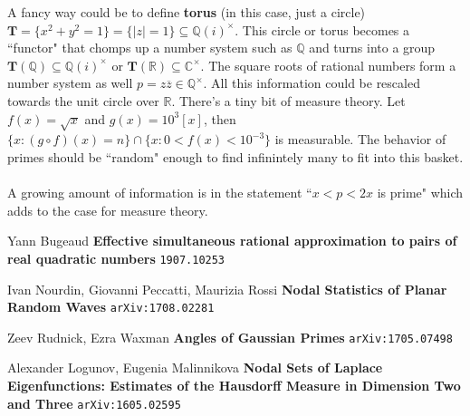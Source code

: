 \documentclass[12pt]{article}
\begin{document}
A fancy way could be to define \textbf{torus} (in this case, just a circle) $\mathbf{T} = \{ x^2 + y^2 = 1\} = \{ |z| = 1\} \subseteq \mathbb{Q}(i)^\times $.  This circle or torus becomes a ``functor" that chomps up a number system such as $\mathbb{Q}$ and turns into a group
$\mathbf{T}(\mathbb{Q}) \subseteq \mathbb{Q}(i)^\times $ or $\mathbf{T}(\mathbb{R}) \subseteq \mathbb{C}^\times$.  The square roots of rational numbers form a number system as well $p =  z \overline{z} \in \mathbb{Q}^\times$.  All this information could be rescaled towards the unit circle over $\mathbb{R}$.  There's a tiny bit of measure theory.  Let $f(x) = \sqrt{x}$ and $g(x) = 10^3[x]$, then $ \{ x : (g \circ f)(x) = n   \} \cap \{ x : 0 < f(x) < 10^{-3} \} $ is measurable.  The behavior of primes should be ``random" enough to find infinintely many to fit into this basket. \\ \\
A growing amount of information is in the statement ``$x < p < 2x $ is prime" which adds to the case for measure theory.
\vfill



\begin{thebibliography}{}

\item Yann Bugeaud {\textbf{Effective simultaneous rational approximation to pairs of real quadratic numbers}} \texttt{1907.10253}
\item Ivan Nourdin, Giovanni Peccatti, Maurizia Rossi \textbf{Nodal Statistics of Planar Random Waves} \texttt{arXiv:1708.02281}
\item Zeev Rudnick, Ezra Waxman \textbf{Angles of Gaussian Primes} \texttt{arXiv:1705.07498}
\item Alexander Logunov, Eugenia Malinnikova \textbf{Nodal Sets of Laplace Eigenfunctions: Estimates of the Hausdorff Measure in Dimension Two and Three} \texttt{arXiv:1605.02595}
\end{thebibliography} 

\newpage
\end{document}
